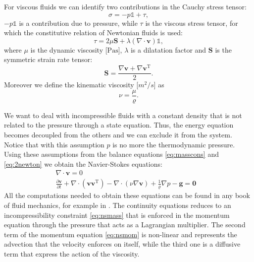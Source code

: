 For viscous fluids we can identify two contributions in the Cauchy stress 
tensor:
\begin{equation}
\sigma = -p\mathbb{1} + \tau,
\end{equation}
$-p\mathbb{1}$ is a contribution due to pressure, while $\tau$ is 
the viscous stress tensor, for which the constitutive relation of Newtonian 
fluids is used:
\begin{equation}
\tau = 2\mu \mathbf{S} + 
\lambda (\nabla \cdot \mathbf{v}) \mathbb{1},
\end{equation}
where $\mu$ is the dynamic viscosity [$\si{\pascal\second}$], $\lambda$ 
is a dilatation factor and $\mathbf{S}$ is the symmetric strain rate tensor:
\begin{equation*}
\mathbf{S} = \frac{\nabla \mathbf{v} + \nabla \mathbf{v}^\mathrm{T}}{2}.
\end{equation*} 
Moreover we define the kinematic viscosity 
[$\si{m^2/s}$] as
\begin{equation}
\nu = \frac{\mu}{\varrho}.
\end{equation}

We want to deal with incompressible fluids with a constant density that is not 
related to the pressure through a state equation. Thus, the 
energy equation becomes decoupled from the others and we can exclude it from 
the system. 
Notice that with this assumption $p$ is no more the thermodynamic pressure.
Using these assumptions from the balance equations 
\eqref{eq:masscons} and \eqref{eq:2newton} we obtain the Navier-Stokes 
equations:
\begin{align}
\label{eq:nsmass} \nabla \cdot \mathbf{v} = 0&\\
\label{eq:nsmom} \frac{\partial \mathbf{v}}{\partial t} + \nabla 
\cdot (\mathbf{v} \mathbf{v}^\mathrm{T}) - \nabla \cdot (\nu \nabla 
\mathbf{v}) + \frac{1}{\varrho}\nabla p  -\mathbf{g} = \mathbf{0}&
\end{align}
All the computations needed to obtain these equations can be found in any book 
of fluid mechanics, for example in \cite{main:vermal}. The continuity equations 
reduces to an incompressibility constraint \eqref{eq:nsmass} that is enforced 
in the momentum equation through the pressure that acts as a Lagrangian 
multiplier. The second term of the momentum equation \eqref{eq:nsmom} is 
non-linear and represents the advection that the velocity enforces on itself, 
while the third one is a diffusive term that express the action of the 
viscosity.
%

